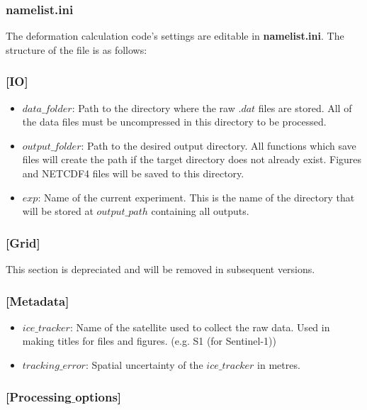 \documentclass[12pt]{article}
\begin{document}
\subsubsection*{\textbf{namelist.ini}}

The deformation calculation code's settings are editable in \textbf{namelist.ini}. The structure of the file is as follows:

\subsubsection*{[IO]}

\begin{itemize}
    \item $data\_folder$: Path to the directory where the raw $.dat$ files are stored. All of the data files must be uncompressed in this directory to be processed.
    \item $output\_folder$: Path to the desired output directory. All functions which save files will create the path if the target directory does not already exist. Figures and NETCDF4 files will be saved to this directory.
    \item $exp$: Name of the current experiment. This is the name of the directory that will be stored at $output\_path$ containing all outputs.
\end{itemize}

\subsubsection*{[Grid]}

This section is depreciated and will be removed in subsequent versions.

\subsubsection*{[Metadata]}

\begin{itemize}
    \item $ice\_tracker$: Name of the satellite used to collect the raw data. Used in making titles for files and figures. (e.g. S1 (for Sentinel-1))
    \item $tracking\_error$: Spatial uncertainty of the $ice\_tracker$ in metres.
\end{itemize}

\subsubsection*{[Processing$\_$options]}
\end{document}
